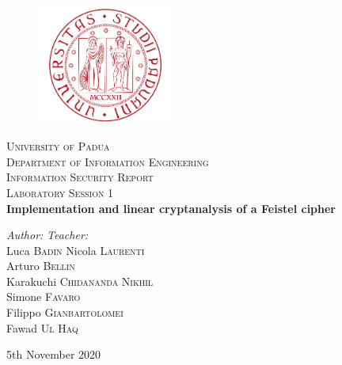 \documentclass{report}
\begin{document}
\begin{titlepage}
\begin{center}
\vspace*{0.8cm}
\begin{figure}[H]
\centering
\includegraphics[width=0.4\textwidth]{logo_uni}
\end{figure}
\LARGE{\textsc{University of Padua}}\\
\vspace*{0.1cm}
\Large{\textsc{Department of Information Engineering}}\\
\vspace*{1.8cm}
\Large{\textsc{Information Security Report}}\\
\vspace*{0.1cm}
\Large{\textsc{Laboratory Session 1}}\\
\vspace*{0.8cm}
\huge{\textbf{Implementation and linear cryptanalysis of a Feistel cipher}}\\
\vspace*{1cm}
\end{center}
\large{\textit{Author:}}
\hfill
\large{\textit{Teacher:}} \\
\large{Luca \textsc{Badin}}
\hfill
\large{Nicola \textsc{Laurenti}}\\
\large{Arturo \textsc{Bellin}}\\
\large{Karakuchi \textsc{Chidananda Nikhil}}\\
\large{Simone \textsc{Favaro}}\\
\large{Filippo \textsc{Gianbartolomei}}\\
\large{Fawad \textsc{Ul Haq}}\\

\vspace*{0cm}
\begin{center}
\large{5th November 2020}\\
\end{center}
\end{titlepage}
\pagebreak


\setcounter{page}{1}
\end{document}
